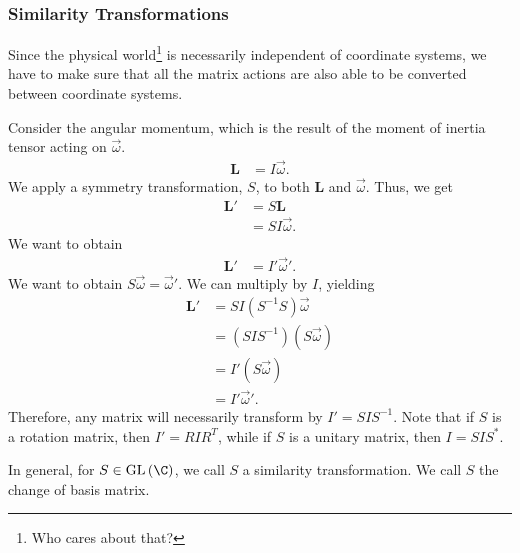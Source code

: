 \documentclass[10pt]{mypackage}
\begin{document}
\subsubsection{Similarity Transformations}%
Since the physical world\footnote{Who cares about that?} is necessarily independent of coordinate systems, we have to make sure that all the matrix actions are also able to be converted between coordinate systems.\newline

Consider the angular momentum, which is the result of the moment of inertia tensor acting on $\vec{\omega}$.
\begin{align*}
  \mathbf{L} &= I\vec{\omega}.
\end{align*}
We apply a symmetry transformation, $S$, to both $\mathbf{L}$ and $\vec{\omega}$. Thus, we get
\begin{align*}
  \mathbf{L}' &= S\mathbf{L}\\
              &= SI\vec{\omega}.
\end{align*}
We want to obtain
\begin{align*}
  \mathbf{L}' &= I'\vec{\omega}'.
\end{align*}
We want to obtain $S\vec{\omega} = \vec{\omega}'$. We can multiply by $I$, yielding
\begin{align*}
  \mathbf{L}' &= SI\left(S^{-1}S\right)\vec{\omega}\\
              &= \left(SIS^{-1}\right)\left(S\vec{\omega}\right)\\
              &= I'\left(S\vec{\omega}\right)\\
              &= I'\vec{\omega}'.
\end{align*}
Therefore, any matrix will necessarily transform by $I' = SIS^{-1}$. Note that if $S$ is a rotation matrix, then $I' = RIR^{T}$, while if $S$ is a unitary matrix, then $I = SIS^{\ast}$.\newline

In general, for $S\in \text{GL}\left(\C\right)$, we call $S$ a similarity transformation. We call $S$ the change of basis matrix.\newline
\end{document}
